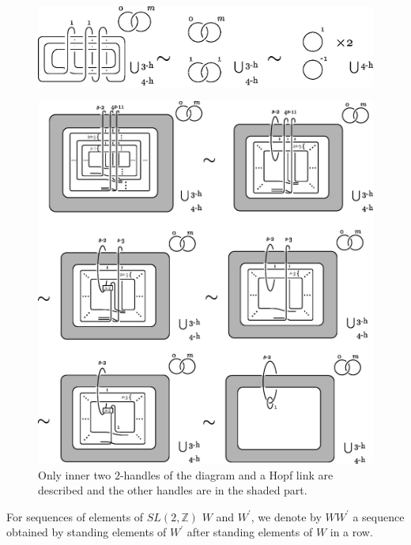 \documentclass{amsart}
\theoremstyle{plain}
\theoremstyle{definition}
\begin{document}
\begin{figure}[htbp]
\begin{center}
\includegraphics[width=145mm]{movesT_3.eps}
\end{center}
\caption{}
\label{movesT_3}
\end{figure}

\begin{figure}[htbp]
\begin{center}
\includegraphics[width=145mm]{movesT_s2.eps}
\end{center}
\caption{Only inner two $2$-handles of the diagram and a Hopf link are described and the other handles are in the shaded part. 
}
\label{movesT_s2}
\end{figure}

For sequences of elements of $SL(2,\mathbb{Z})$ $W$ and $W^\prime$, 
we denote by $WW^\prime$ a sequence obtained by standing elements of $W^\prime$ after standing elements of $W$ in a row. 
\end{document}
